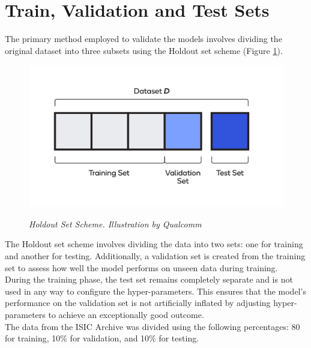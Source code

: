 \section{Train, Validation and Test Sets}

The primary method employed to validate the models involves dividing the
original dataset into three subsets using the Holdout set scheme (Figure
\ref{fig:holdout-test-scheme}).

\begin{figure}[H]
  \centering
  \begin{adjustbox}{width=0.8\textwidth, trim={0cm 0.5cm 0cm 0.5cm}, clip}
    \includegraphics[width=\textwidth]{imatges/preliminaries/train-test-validation-sets.png}
  \end{adjustbox}
  \caption[Holdout Set Scheme]{\textit{Holdout Set Scheme. Illustration by Qualcomm}}
  {\label{fig:holdout-test-scheme}}
\end{figure}

The Holdout set scheme involves dividing the data into two sets: one for
training and another for testing. Additionally, a validation set is created
from the training set to assess how well the model performs on unseen data
during training. \\

During the training phase, the test set remains completely separate and is not
used in any way to configure the hyper-parameters. This ensures that the
model's performance on the validation set is not artificially inflated by
adjusting hyper-parameters to achieve an exceptionally good outcome. \\

The data from the ISIC Archive was divided using the following percentages: 80%
for training, 10\% for validation, and 10\% for testing.

